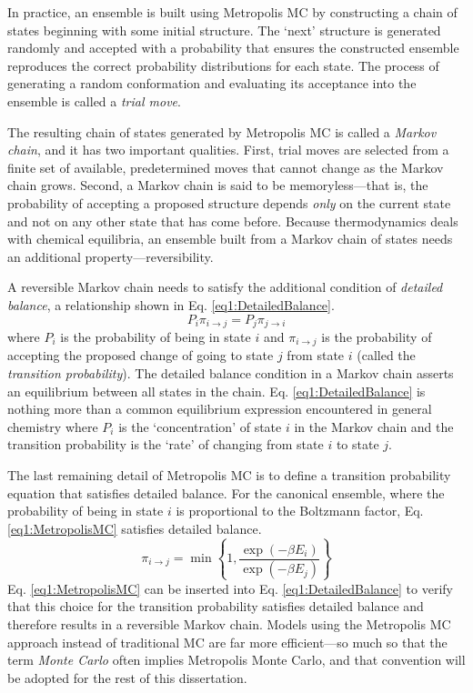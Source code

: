 In practice, an ensemble is built using Metropolis MC by constructing a chain of
states beginning with some initial structure. The `next' structure is generated
randomly and accepted with a probability that ensures the constructed ensemble
reproduces the correct probability distributions for each state. The process of
generating a random conformation and evaluating its acceptance into the ensemble
is called a \emph{trial move}.

The resulting chain of states generated by Metropolis MC is called a
\emph{Markov chain}, and it has two important qualities. First, trial moves are
selected from a finite set of available, predetermined moves that cannot change
as the Markov chain grows. Second, a Markov chain is said to be
memoryless---that is, the probability of accepting a proposed structure depends
\emph{only} on the current state and not on any other state that has come
before. Because thermodynamics deals with chemical equilibria, an ensemble built
from a Markov chain of states needs an additional property---reversibility.

A reversible Markov chain needs to satisfy the additional condition of
\emph{detailed balance}, a relationship shown in Eq. \ref{eq1:DetailedBalance}.
\begin{equation}
   P_i \pi_{i \rightarrow j} = P_j \pi_{j \rightarrow i}
   \label{eq1:DetailedBalance}
\end{equation}
where $P_i$ is the probability of being in state $i$ and $\pi_{i \rightarrow j}$
is the probability of accepting the proposed change of going to state $j$ from
state $i$ (called the \emph{transition probability}). The detailed balance
condition in a Markov chain asserts an equilibrium between all states in the
chain. Eq. \ref{eq1:DetailedBalance} is nothing more than a common equilibrium
expression encountered in general chemistry where $P_i$ is the `concentration'
of state $i$ in the Markov chain and the transition probability is the `rate' of
changing from state $i$ to state $j$.

The last remaining detail of Metropolis MC is to define a transition probability
equation that satisfies detailed balance. For the canonical ensemble, where the
probability of being in state $i$ is proportional to the Boltzmann factor, Eq.
\ref{eq1:MetropolisMC} satisfies detailed balance.
\begin{equation}
   \pi_{i \rightarrow j} = \min \left \lbrace 1, \frac {\exp ( -\beta E _ i )}
                         {\exp ( -\beta E _ j ) } \right \rbrace
   \label{eq1:MetropolisMC}
\end{equation}
Eq. \ref{eq1:MetropolisMC} can be inserted into Eq. \ref{eq1:DetailedBalance} to
verify that this choice for the transition probability satisfies detailed
balance and therefore results in a reversible Markov chain. Models using the
Metropolis MC approach instead of traditional MC are far more efficient---so
much so that the term \emph{Monte Carlo} often implies Metropolis Monte Carlo,
\cite{Tuckerman_Book_StatMech_TheoryAndSim,Leach_Book_MolModel_2001} and that
convention will be adopted for the rest of this dissertation.

